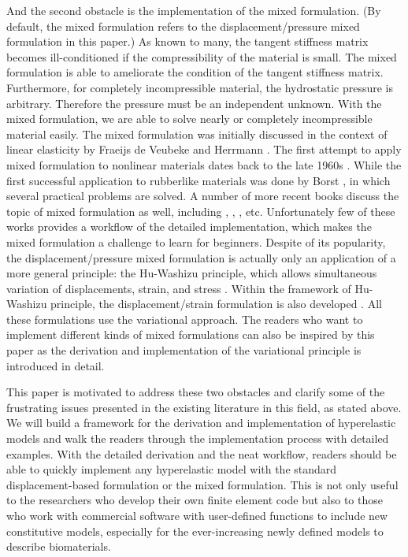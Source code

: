 And the second obstacle is the implementation of the mixed formulation. (By default, the mixed formulation refers to the displacement/pressure mixed formulation in this paper.) As known to many, the tangent stiffness matrix becomes ill-conditioned if the compressibility of the material is small. The mixed formulation is able to ameliorate the condition of the tangent stiffness matrix. Furthermore, for completely incompressible material, the hydrostatic pressure is arbitrary. Therefore the pressure must be an independent unknown. With the mixed formulation, we are able to solve nearly or completely incompressible material easily. 
The mixed formulation was initially discussed in the context of linear elasticity by Fraeijs de Veubeke \cite{Veubeke} and Herrmann \cite{Herrmann}. The first attempt to apply mixed formulation to nonlinear materials dates back to the late 1960s \cite{Oden}. While the first successful application to rubberlike materials was done by Borst \cite{Borst}, in which several practical problems are solved. A number of more recent books discuss the topic of mixed formulation as well, including \cite{Bathe}, \cite{Holzapfel}, \cite{Zienkiewicz}, etc. Unfortunately few of these works provides a workflow of the detailed implementation, which makes the mixed formulation a challenge to learn for beginners. Despite of its popularity, the displacement/pressure mixed formulation is actually only an application of a more general principle: the Hu-Washizu principle, which allows simultaneous variation of displacements, strain, and stress \cite{Hu}. Within the framework of Hu-Washizu principle, the displacement/strain formulation is also developed \cite{Cervera, Rifai}. All these formulations use the variational approach. The readers who want to implement different kinds of mixed formulations can also be inspired by this paper as the derivation and implementation of the variational principle is introduced in detail. 

This paper is motivated to address these two obstacles and clarify some of the frustrating issues presented in the existing literature in this field, as stated above. We will build a framework for the derivation and implementation of hyperelastic models and walk the readers through the implementation process with detailed examples. With the detailed derivation and the neat workflow, readers should be able to quickly implement any hyperelastic model with the standard displacement-based formulation or the mixed formulation. This is not only useful to the researchers who develop their own finite element code but also to those who work with commercial software with user-defined functions to include new constitutive models, especially for the ever-increasing newly defined models to describe biomaterials.

